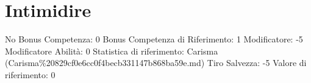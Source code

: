 \section{Intimidire}\label{intimidire}

\begin{description}
\tightlist
\item[Tags: ABI]
No Bonus Competenza: 0 Bonus Competenza di Riferimento: 1 Modificatore:
-5 Modificatore Abilità: 0 Statistica di riferimento: Carisma
(Carisma\%20829cf0e6cc0f4becb331147b868ba59e.md) Tiro Salvezza: -5
Valore di riferimento: 0
\end{description}
